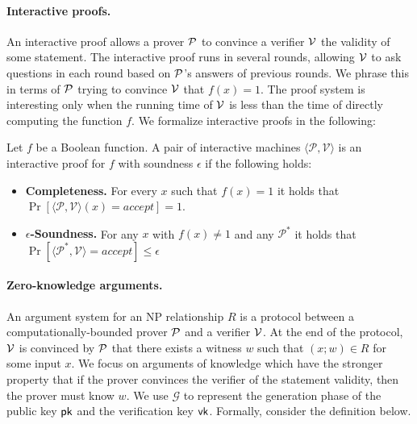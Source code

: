 \paragraph{Interactive proofs.} An interactive proof allows a prover $\P$ to convince a verifier $\V$ the validity of some statement. The interactive proof runs in several rounds, allowing $\V$ to ask questions in each round based on $\P$'s answers of previous rounds. We phrase this in terms of $\P$ trying to convince $\V$ that $f(x)=1$. The proof system is interesting only when the running time of $\V$ is less than the time of directly computing the function $f$. We formalize interactive proofs in the following:	
\begin{definition}\label{def:ip}
	Let $f$ be a Boolean function. A pair of interactive machines $\langle\mathcal{P}, \mathcal{V}\rangle$ is an interactive proof for $f$ with soundness $\epsilon$ if the following holds:
	\begin{itemize}
		\item {\bf Completeness.} For every $x$ such that $f(x) = 1$ it holds that $\Pr[\langle\mathcal{P}, \mathcal{V}\rangle(x)=accept]=1$.
		\item {\bf $\epsilon$-Soundness.} For any $x$ with $f(x) \neq 1$ and any $\mathcal{P}^*$ it holds that $\Pr[\langle\mathcal{P^*},\mathcal{V}\rangle=accept] \le \epsilon$
	\end{itemize}
\end{definition}


\paragraph{Zero-knowledge arguments.} An argument system for an NP relationship $R$ is a protocol between a computationally-bounded prover $\P$ and a verifier $\V$. At the end of the protocol, $\V$ is convinced by $\P$ that there exists a witness $w$ such that $(x; w) \in R$ for some input $x$. We focus on arguments of knowledge which have the stronger property that if the prover convinces the verifier of the statement validity, then the prover must know $w$. We use $\mathcal{G}$ to represent the generation phase of the public key $\pk$ and the verification key $\vk$. Formally, consider the definition below.


